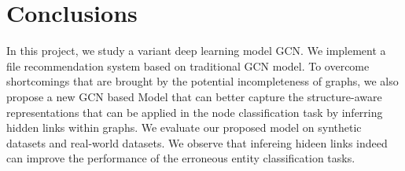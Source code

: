 
\section{Conclusions}
\label{sec-conclude}
In this project, we study a variant deep learning model GCN. We implement a file recommendation system based on traditional GCN model. To overcome shortcomings that are brought by the potential incompleteness of graphs, we also propose a new GCN based Model that can better capture the structure-aware representations that can be applied in the node classification task by inferring hidden links within graphs. We evaluate our proposed model on synthetic datasets and real-world datasets. We observe that infereing hideen links indeed can improve the performance of the erroneous entity classification tasks.
